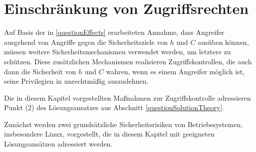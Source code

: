 \documentclass[../main.tex]{subfiles}
\begin{document}






  \section{Einschränkung von Zugriffsrechten}
		\label{secAccessControls}

		Auf Basis der in \ref{questionEffects} erarbeiteten Annahme, dass Angreifer ausgehend von \cbroken{} Angriffe gegen die Sicherheitsziele von \(h\) und \(C\) ausüben können, müssen weitere Sicherheitsmechanismen verwendet werden, um letztere zu schützen. Diese zusätzlichen Mechanismen realisieren Zugriffskontrollen, die auch dann die Sicherheit von \(h\) und \(C\) wahren, wenn es einem Angreifer möglich ist, seine Privilegien in \cbroken{} unrechtmäßig auszudehnen.

		Die in diesem Kapitel vorgestellten Maßnahmen zur Zugriffskontrolle adressieren Punkt (2) des Lösungsansatzes aus Abschnitt \ref{questionSolutionTheory}.

		Zunächst werden zwei grundsätzliche Sicherheitsrisiken von Betriebssystemen, insbesondere Linux, vorgestellt, die in diesem Kapitel mit geeigneten Lösungsansätzen adressiert werden.
\end{document}
